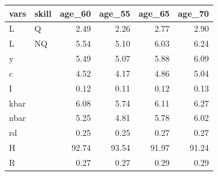 \begin{tabular}{llrrrr}
  \hline
vars & skill & age\_60 & age\_55 & age\_65 & age\_70 \\ 
  \hline
L & Q & 2.49 & 2.26 & 2.77 & 2.90 \\ 
  L & NQ & 5.54 & 5.10 & 6.03 & 6.24 \\ 
  y &  & 5.49 & 5.07 & 5.88 & 6.09 \\ 
  c &  & 4.52 & 4.17 & 4.86 & 5.04 \\ 
  I &  & 0.12 & 0.11 & 0.12 & 0.13 \\ 
  kbar &  & 6.08 & 5.74 & 6.11 & 6.27 \\ 
  nbar &  & 5.25 & 4.81 & 5.78 & 6.02 \\ 
  rd &  & 0.25 & 0.25 & 0.27 & 0.27 \\ 
  H &  & 92.74 & 93.54 & 91.97 & 91.24 \\ 
  R &  & 0.27 & 0.27 & 0.29 & 0.29 \\ 
   \hline
\end{tabular}

